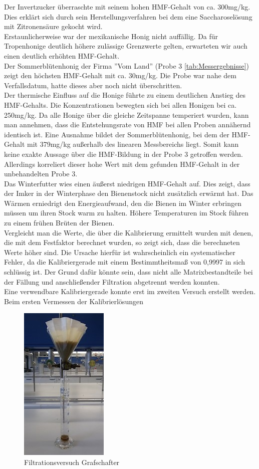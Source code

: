 Der Invertzucker überraschte mit seinem hohen HMF-Gehalt von ca. 300mg/kg. Dies erklärt sich durch sein Herstellungsverfahren bei dem eine Saccharoselösung mit Zitronensäure gekocht wird.\\
Erstaunlicherweise war der mexikanische Honig nicht auffällig. Da für Tropenhonige deutlich höhere zulässige Grenzwerte gelten, erwarteten wir auch einen deutlich erhöhten HMF-Gehalt. \\
Der Sommerblütenhonig der Firma ''Vom Land'' (Probe 3 \ref{tab:Messergebnisse}) zeigt den höchsten HMF-Gehalt mit ca. 30mg/kg. Die Probe war nahe dem Verfallsdatum, hatte dieses aber noch nicht überschritten.\\
Der thermische Einfluss auf die Honige führte zu einem deutlichen Anstieg des HMF-Gehalts. Die Konzentrationen bewegten sich bei allen Honigen bei ca. 250mg/kg. Da alle Honige über die gleiche Zeitspanne temperiert wurden, kann man annehmen, dass die Entstehungsrate von HMF bei allen Proben annähernd identisch ist. Eine Ausnahme bildet der Sommerblütenhonig, bei dem der HMF-Gehalt mit 379mg/kg außerhalb des linearen Messbereichs liegt. Somit kann keine exakte Aussage über die HMF-Bildung in der Probe 3 getroffen werden. Allerdings korreliert dieser hohe Wert mit dem gefunden HMF-Gehalt in der unbehandelten Probe 3.\\
Das Winterfutter wies einen äußerst niedrigen HMF-Gehalt auf. Dies zeigt, dass der Imker in der Winterphase den Bienenstock nicht zusätzlich erwärmt hat. Das Wärmen erniedrigt den Energieaufwand, den die Bienen im Winter erbringen müssen um ihren Stock warm zu halten. Höhere Temperaturen im Stock führen zu einem frühen Brüten der Bienen.~\cite{Imkern}\\
Vergleicht man die Werte, die über die Kalibrierung ermittelt wurden mit denen, die mit dem Festfaktor berechnet wurden, so zeigt sich, dass die berechneten Werte höher sind. Die Ursache hierfür ist wahrscheinlich ein systematischer Fehler, da die Kalibriergerade mit einem Bestimmtheitsmaß von 0,9997 in sich schlüssig ist. Der Grund dafür könnte sein, dass nicht alle Matrixbestandteile bei der Fällung und anschließender Filtration abgetrennt werden konnten.\\
Eine verwendbare Kalibriergerade konnte erst im zweiten Versuch erstellt werden. Beim ersten Vermessen der Kalibrierlösungen 
\begin{figure}[hbp]
  \centering
  \includegraphics{../Bilder/20150427_153416.jpg}
  \caption{Filtrationsversuch Grafschafter}
  \label{fig:Grafschafter}
\end{figure}
